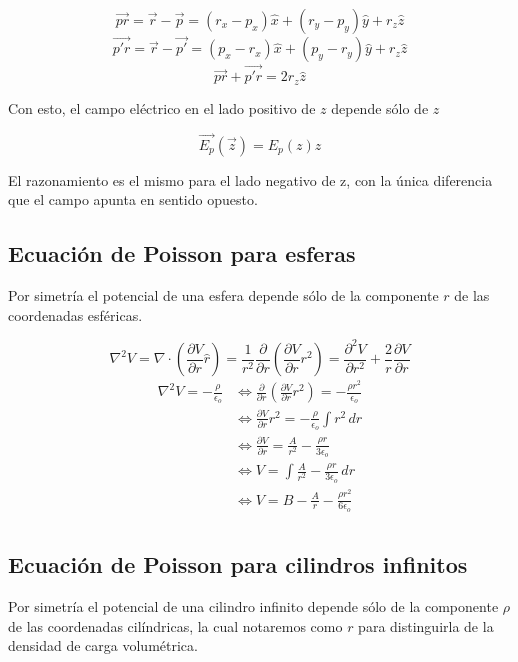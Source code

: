 \[\Vec{pr} = \Vec{r}-\Vec{p} = (r_x-p_x)\hat{x} + (r_y-p_y)\hat{y} + r_z\hat{z}\]
\[\Vec{p'r} = \Vec{r}-\Vec{p'} = (p_x-r_x)\hat{x} + (p_y-r_y)\hat{y} + r_z\hat{z}\]
\[\Vec{pr}+\Vec{p'r} = 2r_z\hat{z}\]

Con esto, el campo eléctrico en el lado positivo de $z$ depende sólo de $z$

\[\Vec{E_p}(\Vec{z})=E_p(z)\hat{z}\]

El razonamiento es el mismo para el lado negativo de z, con la única diferencia que el campo apunta en sentido opuesto.

\subsection{Ecuación de Poisson para esferas}
\label{PoissonEsferas}
Por simetría el potencial de una esfera depende sólo de la componente $r$ de las coordenadas esféricas.


\[\nabla^2V =
\nabla\cdot\left(\frac{\partial V}{\partial r}\hat{r}\right) =
\frac{1}{r^2}\frac{\partial}{\partial r}\left(\frac{\partial V}{\partial r}r^2\right) =
\frac{\partial^2 V}{\partial r^2}+\frac{2}{r}\frac{\partial V}{\partial r}
\]
\begin{equation}
\begin{split}
\nabla^2V = -\frac{\rho}{\epsilon_o} & \Leftrightarrow
\frac{\partial}{\partial r}\left(\frac{\partial V}{\partial r}r^2\right) = -\frac{\rho r^2}{\epsilon_o}
\\
& \Leftrightarrow \frac{\partial V}{\partial r}r^2 =
-\frac{\rho}{\epsilon_o}\int r^2\,dr
\\
& \Leftrightarrow \frac{\partial V}{\partial r} =
\frac{A}{r^2} - \frac{\rho r}{3\epsilon_o}
\\
& \Leftrightarrow V =
\int\frac{A}{r^2} - \frac{\rho r}{3\epsilon_o}\,dr
\\
& \Leftrightarrow V = 
B-\frac{A}{r} - \frac{\rho r^2}{6\epsilon_o}
\\
\end{split}
\nonumber
\end{equation}

\subsection{Ecuación de Poisson para cilindros infinitos}
\label{PoissonCilindrosInf}
Por simetría el potencial de una cilindro infinito depende sólo de la componente $\rho$ de las coordenadas cilíndricas, la cual notaremos como $r$ para distinguirla de la densidad de carga volumétrica.

